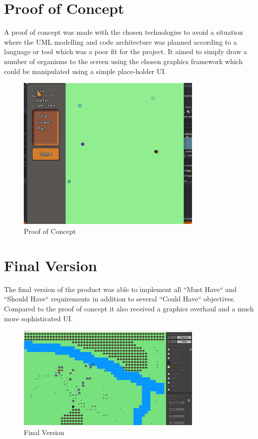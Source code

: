 \documentclass[a4paper, oneside, 11pt]{report}
\begin{document}
\section{Proof of Concept}
A proof of concept was made with the chosen technologies to avoid a situation where the UML modelling and code architecture was planned according to a language or tool which was a poor fit for the project. It aimed to simply draw a number of organisms to the screen using the chosen graphics framework which could be manipulated using a simple place-holder UI.

\begin{figure}[H]
	\caption{Proof of Concept}\label{poc}
	\centering
	\includegraphics[width=0.8\textwidth]{poc}
\end{figure}

\section{Final Version}
The final version of the product was able to implement all ``Must Have`` and ``Should Have`` requirements in addition to several ``Could Have`` objectives. Compared to the proof of concept it also received a graphics overhaul and a much more sophisticated UI.

\begin{figure}[H]
	\caption{Final Version}\label{final-ver}
	\centering
	\includegraphics[width=0.8\textwidth]{final-ver}
\end{figure}
\end{document}

